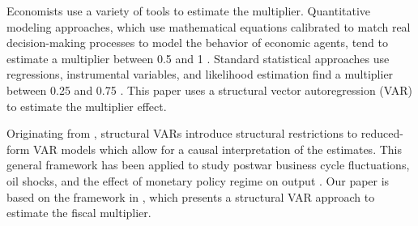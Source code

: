 Economists use a variety of tools to estimate the multiplier. Quantitative modeling approaches, which use mathematical equations calibrated to match real decision-making processes to model the behavior of economic agents, tend to estimate a multiplier between 0.5 and 1 \parencite{gechert2012fiscal}. Standard statistical approaches use regressions, instrumental variables, and likelihood estimation find a multiplier between 0.25 and 0.75 \parencite{gechert2012fiscal}. This paper uses a structural vector autoregression (VAR) to estimate the multiplier effect.

Originating from \textcite{sims1980macroeconomics}, structural VARs introduce structural restrictions to reduced-form VAR models which allow for a causal interpretation of the estimates.  This general framework has been applied to study postwar business cycle fluctuations, oil shocks, and the effect of monetary policy regime on output \parencites{hamilton1983oil}{hodrick1997postwar}{sims2006were}. Our paper is based on the framework in \textcite{blanchard2002empirical}, which presents a structural VAR approach to estimate the fiscal multiplier. 
